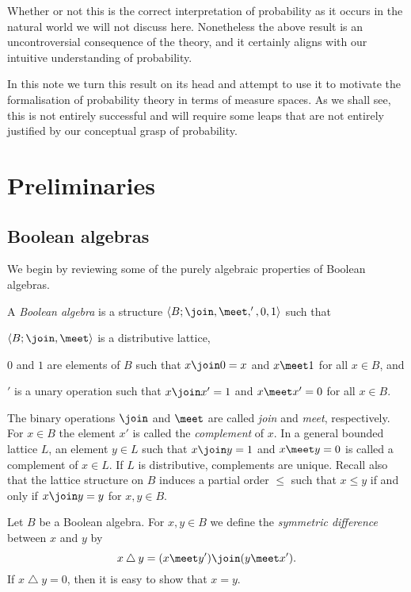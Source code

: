 \documentclass[article, a4paper, 11pt, oneside]{memoir}
\numberwithin{equation}{chapter}
\renewcommand{\symdiff}{\mathbin{\triangle}}
\begin{document}
Whether or not this is the correct interpretation of probability as it occurs in the natural world we will not discuss here. Nonetheless the above result is an uncontroversial consequence of the theory, and it certainly aligns with our intuitive understanding of probability.

In this note we turn this result on its head and attempt to use it to motivate the formalisation of probability theory in terms of measure spaces. As we shall see, this is not entirely successful and will require some leaps that are not entirely justified by our conceptual grasp of probability.


\chapter{Preliminaries}


\section{Boolean algebras}

We begin by reviewing some of the purely algebraic properties of Boolean algebras.

\begin{definition}
    \label{def:Boolean-algebra}
    A \emph{Boolean algebra} is a structure $\langle B; \join, \meet, ', 0, 1 \rangle$ such that
    \begin{enumdef}
        \item $\langle B; \join, \meet \rangle$ is a distributive lattice,
        \item $0$ and $1$ are elements of $B$ such that $x \join 0 = x$ and $x \meet 1$ for all $x \in B$, and
        \item $'$ is a unary operation such that $x \join x' = 1$ and $x \meet x' = 0$ for all $x \in B$.
    \end{enumdef}
\end{definition}
%
The binary operations $\join$ and $\meet$ are called \emph{join} and \emph{meet}, respectively. For $x \in B$ the element $x'$ is called the \emph{complement} of $x$. In a general bounded lattice $L$, an element $y \in L$ such that $x \join y = 1$ and $x \meet y = 0$ is called a complement of $x \in L$. If $L$ is distributive, complements are unique. Recall also that the lattice structure on $B$ induces a partial order $\leq$ such that $x \leq y$ if and only if $x \join y = y$ for $x,y \in B$.

Let $B$ be a Boolean algebra. For $x,y \in B$ we define the \emph{symmetric difference} between $x$ and $y$ by
%
\begin{equation*}
    x \symdiff y
        = (x \meet y') \join (y \meet x').
\end{equation*}
%
If $x \symdiff y = 0$, then it is easy to show that $x = y$.
\end{document}
